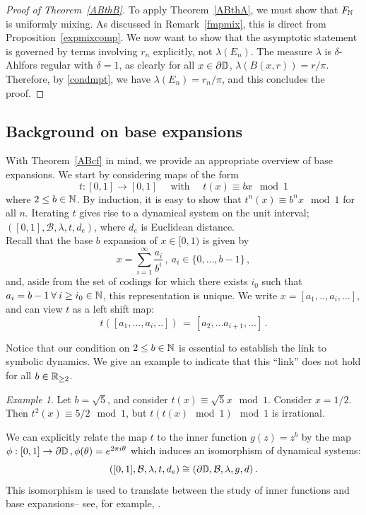 \documentclass[11pt,reqno]{amsart}
\newcommand{\R}{{\Bbb R}}
\newcommand{\N}{{\Bbb N}}
\newcommand{\D}{{\Bbb D}}
\newcommand{\0}{\mathbf{0}}
\theoremstyle{remark}
\numberwithin{equation}{section}
\theoremstyle{remark}
\newtheorem*{example}{Example}
\numberwithin{equation}{section}
\begin{document}
\begin{proof}[Proof of Theorem~\ref{ABthB}]
     To apply Theorem~\ref{ABthA}, we must show that $F_\N$ is uniformly mixing. As discussed in Remark~\ref{fmpmix}, this is direct from Proposition~\ref{expmixcomp}. We now want to show that the asymptotic statement is governed by terms involving $r_n$ explicitly, not $\lambda(E_n)$. The measure $\lambda$ is $\delta$-Ahlfors regular with $\delta=1$, as clearly for all $x \in \partial \D$, $\lambda(B(x,r))=r/\pi$. Therefore, by \eqref{condmpt}, we have $\lambda(E_n)=r_n/\pi$, and this concludes the proof.
\end{proof}


\subsection{Background on base expansions}\label{backbase}
With Theorem~\ref{ABcf} in mind, we provide an appropriate overview of base expansions.
We start by considering maps of the form 
$$
t: [0,1] \to [0,1] \quad \text{ with } \quad  t(x) \equiv bx \mod 1 
$$
where $2\leq b \in \N$.  By induction, it is easy to show that $t^n(x) \equiv b^n x \mod 1$ for all $n$.  Iterating $t$ gives rise to a dynamical system on the unit interval;  $([0,1],\mathcal{B},\lambda,t, d_{e})$, where $d_e$ is Euclidean distance.
\\
Recall that the base $b$ expansion of $x \in [0,1)$ is given by
$$
x = \sum_{i=1}^{\infty} \frac{a_i}{b^i} \, , \  a_i \in \{0,\dots,b-1\} \, ,
$$
and, aside from the set of codings for which there exists $i_0$ such that $a_i=b-1 \: \forall \: i \geq i_0 \in \N$, this representation is unique. We write $x=[a_1,..,a_i,\dots]$, and can view $t$ as a left shift map:
$$t([a_1,\dots,a_i,..]) \, = \,  [a_2,\dots a_{i+1},\dots] \, .$$

 Notice that our condition on $2 \leq b \in \N $ is essential to establish the link to symbolic dynamics. We give an example to indicate that this ``link'' does not hold for all $b \in \R_{\geq2}$. 
\begin{example}
Let $b= \sqrt{5}$, and consider $t(x) \equiv \sqrt{5}x \mod 1$. Consider $x=1/2$. Then $t^2(x)\equiv5/2\mod 1$, but $t(t(x)\mod 1)\mod 1$ is irrational.
\end{example}
We can explicitly relate the map $t$ to the inner function $g(z)=z^b$ by the map $\phi : [0,1] \to \partial \D \, , \phi(\theta)=e^{2 \pi i \theta}$ which induces an isomorphism of dynamical systems:
$$([0,1],\mathcal{B},\lambda,t, d_{e}) \cong (\partial \D,\mathcal{B}, \lambda,g, d) \, .$$ 
This isomorphism is used to translate between the study of inner functions and base expansions-- see, for example, \cite[Theorem~4.5]{FMP}. 
\end{document}
